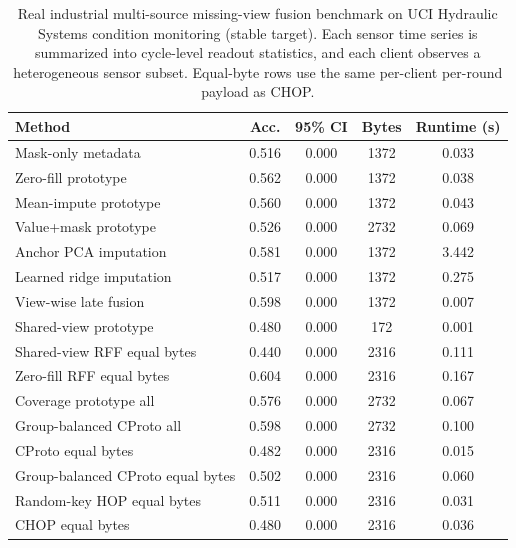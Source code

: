 \begin{table}[t]
\centering
\caption{Real industrial multi-source missing-view fusion benchmark on UCI Hydraulic Systems condition monitoring (stable target). Each sensor time series is summarized into cycle-level readout statistics, and each client observes a heterogeneous sensor subset. Equal-byte rows use the same per-client per-round payload as CHOP.}
\label{tab:if-hydraulic-fusion}
\scriptsize
\setlength{\tabcolsep}{3pt}
\renewcommand{\arraystretch}{0.94}
\begin{tabular}{lcccc}
\toprule
Method & Acc. & 95\% CI & Bytes & Runtime (s) \\
\midrule
Mask-only metadata & 0.516 & 0.000 & 1372 & 0.033 \\
Zero-fill prototype & 0.562 & 0.000 & 1372 & 0.038 \\
Mean-impute prototype & 0.560 & 0.000 & 1372 & 0.043 \\
Value+mask prototype & 0.526 & 0.000 & 2732 & 0.069 \\
Anchor PCA imputation & 0.581 & 0.000 & 1372 & 3.442 \\
Learned ridge imputation & 0.517 & 0.000 & 1372 & 0.275 \\
View-wise late fusion & 0.598 & 0.000 & 1372 & 0.007 \\
Shared-view prototype & 0.480 & 0.000 & 172 & 0.001 \\
Shared-view RFF equal bytes & 0.440 & 0.000 & 2316 & 0.111 \\
Zero-fill RFF equal bytes & 0.604 & 0.000 & 2316 & 0.167 \\
Coverage prototype all & 0.576 & 0.000 & 2732 & 0.067 \\
Group-balanced CProto all & 0.598 & 0.000 & 2732 & 0.100 \\
CProto equal bytes & 0.482 & 0.000 & 2316 & 0.015 \\
Group-balanced CProto equal bytes & 0.502 & 0.000 & 2316 & 0.060 \\
Random-key HOP equal bytes & 0.511 & 0.000 & 2316 & 0.031 \\
CHOP equal bytes & 0.480 & 0.000 & 2316 & 0.036 \\
\bottomrule
\end{tabular}
\end{table}
